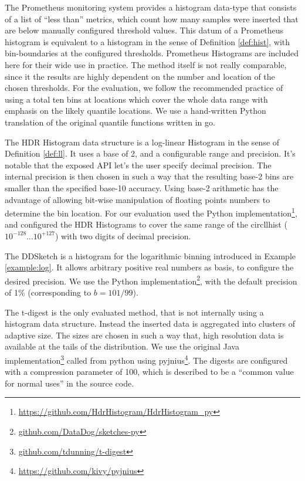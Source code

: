 \documentclass{article}
\theoremstyle{plain}
\theoremstyle{remark}
\begin{document}
The Prometheus monitoring system provides a histogram data-type that consists of a list of ``less
than'' metrics, which count how many samples were inserted that are below manually configured
threshold values. This datum of a Prometheus histogram is equivalent to a histogram in the sense of
Definition \ref{def:hist}, with bin-boundaries at the configured thresholds.  Prometheus Histograms
are included here for their wide use in practice.  The method itself is not really comparable, since
it the results are highly dependent on the number and location of the chosen thresholds. For the
evaluation, we follow the recommended practice of using a total ten bins at locations which cover
the whole data range with emphasis on the likely quantile locations.  We use a hand-written Python
translation of the original quantile functions written in go.

The HDR Histogram data structure is a log-linear Histogram in the sense of Definition \ref{def:ll}.
It uses a base of 2, and a configurable range and precision.  It's notable that the exposed API
let's the user specify decimal precision.  The internal precision is then chosen in such a way that
the resulting base-2 bins are smaller than the specified base-10 accuracy.  Using base-2 arithmetic
has the advantage of allowing bit-wise manipulation of floating points numbers to determine the bin
location. For our evaluation used the Python
implementation\footnote{\url{https://github.com/HdrHistogram/HdrHistogram_py}}, and configured the
HDR Histograms to cover the same range of the circllhist ($10^{-128}\dots10^{+127}$) with two digits
of decimal precision.

The DDSketch is a histogram for the logarithmic binning introduced in Example \ref{example:log}.
It allows arbitrary positive real numbers as basis, to configure the desired precision.
We use the Python implementation\footnote{\url{github.com/DataDog/sketches-py}}, with the default
precision of 1\% (corresponding to $b=101/99$).

The t-digest is the only evaluated method, that is not internally using a histogram data structure.
Instead the inserted data is aggregated into clusters of adaptive size.  The sizes are chosen in
such a way that, high resolution data is available at the tails of the distribution.  We use the
original Java implementation\footnote{\url{github.com/tdunning/t-digest}} called from python
using pyjnius\footnote{\url{https://github.com/kivy/pyjnius}}. The digests are configured with a
compression parameter of 100, which is described to be a ``common value for normal uses'' in
the source code.
\end{document}
